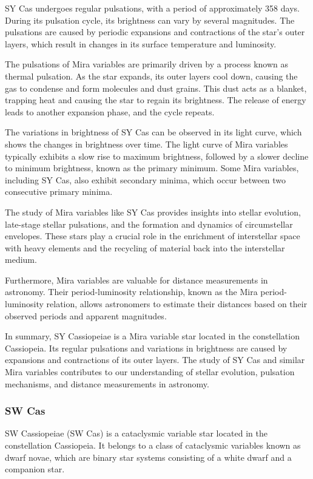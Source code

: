 SY Cas undergoes regular pulsations, with a period of approximately 358 days. During its pulsation cycle, its brightness can vary by several magnitudes. The pulsations are caused by periodic expansions and contractions of the star's outer layers, which result in changes in its surface temperature and luminosity.

The pulsations of Mira variables are primarily driven by a process known as thermal pulsation. As the star expands, its outer layers cool down, causing the gas to condense and form molecules and dust grains. This dust acts as a blanket, trapping heat and causing the star to regain its brightness. The release of energy leads to another expansion phase, and the cycle repeats.

The variations in brightness of SY Cas can be observed in its light curve, which shows the changes in brightness over time. The light curve of Mira variables typically exhibits a slow rise to maximum brightness, followed by a slower decline to minimum brightness, known as the primary minimum. Some Mira variables, including SY Cas, also exhibit secondary minima, which occur between two consecutive primary minima.

The study of Mira variables like SY Cas provides insights into stellar evolution, late-stage stellar pulsations, and the formation and dynamics of circumstellar envelopes. These stars play a crucial role in the enrichment of interstellar space with heavy elements and the recycling of material back into the interstellar medium.

Furthermore, Mira variables are valuable for distance measurements in astronomy. Their period-luminosity relationship, known as the Mira period-luminosity relation, allows astronomers to estimate their distances based on their observed periods and apparent magnitudes.

In summary, SY Cassiopeiae is a Mira variable star located in the constellation Cassiopeia. Its regular pulsations and variations in brightness are caused by expansions and contractions of its outer layers. The study of SY Cas and similar Mira variables contributes to our understanding of stellar evolution, pulsation mechanisms, and distance measurements in astronomy.

\subsubsection*{ SW Cas }
SW Cassiopeiae (SW Cas) is a cataclysmic variable star located in the constellation Cassiopeia. It belongs to a class of cataclysmic variables known as dwarf novae, which are binary star systems consisting of a white dwarf and a companion star.

